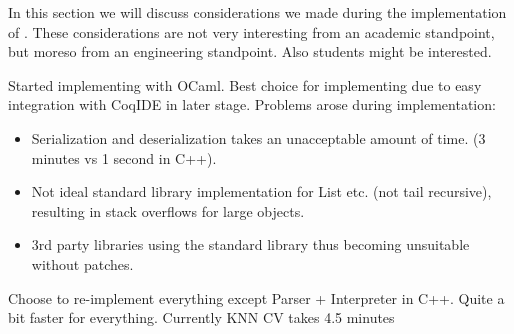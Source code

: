 In this section we will discuss considerations we made during the implementation of \roerei.
These considerations are not very interesting from an academic standpoint, but moreso from an engineering standpoint.
Also students might be interested.

Started implementing with OCaml.
Best choice for implementing due to easy integration with CoqIDE in later stage.
Problems arose during implementation:
\begin{itemize}
\item Serialization and deserialization takes an unacceptable amount of time. (3 minutes vs 1 second in C++).
\item Not ideal standard library implementation for List etc. (not tail recursive), resulting in stack overflows for large objects.
\item 3rd party libraries using the standard library thus becoming unsuitable without patches.
\end{itemize}

Choose to re-implement everything except Parser + Interpreter in C++.
Quite a bit faster for everything.
Currently KNN CV takes 4.5 minutes
